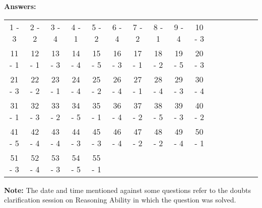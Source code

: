 \documentclass[
]{article}
\begin{document}
\textbf{Answers:}
\begin{tabular}{ c c c c c c c c c c c c c c c c}
 1 - 3 &2 - 2 &3 - 4 &4 - 1 &5 - 2 &6 - 4 &7 - 2 &8 - 1 &9 - 4 &10 - 3\\ 
11 - 1 &12 - 1 &13 - 3 &14 - 4 &15 - 5 &16 - 3 &17 - 1 &18 - 2 &19 - 5 &20 - 3\\
21 - 3 &22 - 2 &23 - 1 &24 - 4 &25 - 2 &26 - 4 &27 - 1 &28 - 4 &29 - 3 &30 - 4\\
31 - 1 &32 - 3 &33 - 2 &34 - 5 &35 - 1 &36 - 4 &37 - 2 &38 - 5 &39 - 3 &40 - 2\\
41 - 5 &42 - 4 &43 - 4 &44 - 3 &45 - 3 &46 - 4 &47 - 2 &48 - 2 &49 - 4 &50 - 1\\
51 - 3 &52 - 4 &53 - 3 &54 - 5 &55 - 1\\
\end{tabular}

\textbf{Note:} The date and time mentioned against some questions refer to the doubts clarification session on Reasoning Ability in which the question was solved.
\end{document}
